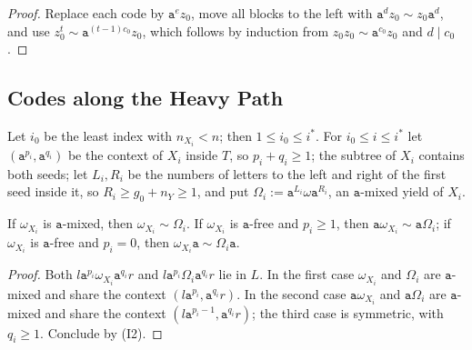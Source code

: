 \begin{proof}
Replace each code by $\mathtt a^ez_0$, move all blocks to the left with
$\mathtt a^dz_0\sim z_0\mathtt a^d$, and use $z_0^t\sim\mathtt a^{(t-1)c_0}z_0$,
which follows by induction from $z_0z_0\sim\mathtt a^{c_0}z_0$ and $d\mid c_0$.
\end{proof}

\subsection{Codes along the Heavy Path}

Let $i_0$ be the least index with $n_{X_i}<n$; then $1\le i_0\le i^*$.  For
$i_0\le i\le i^*$ let $(\mathtt a^{p_i},\mathtt a^{q_i})$ be the context of
$X_i$ inside $T$, so $p_i+q_i\ge1$; the subtree of $X_i$ contains both seeds;
let $L_i,R_i$ be the numbers of letters to the left and right of the first seed
inside it, so $R_i\ge g_0+n_Y\ge1$, and put $\Omega_i:=\mathtt a^{L_i}\omega\mathtt
a^{R_i}$, an $\mathtt a$-mixed yield of $X_i$.

\begin{lemma}
\label{lem:app-h-borrow}
If $\omega_{X_i}$ is $\mathtt a$-mixed, then $\omega_{X_i}\sim\Omega_i$.  If
$\omega_{X_i}$ is $\mathtt a$-free and $p_i\ge1$, then $\mathtt a\omega_{X_i}\sim\mathtt
a\Omega_i$; if $\omega_{X_i}$ is $\mathtt a$-free and $p_i=0$, then
$\omega_{X_i}\mathtt a\sim\Omega_i\mathtt a$.
\end{lemma}

\begin{proof}
Both $l\mathtt a^{p_i}\omega_{X_i}\mathtt a^{q_i}r$ and $l\mathtt a^{p_i}\Omega_i
\mathtt a^{q_i}r$ lie in $L$.  In the first case $\omega_{X_i}$ and $\Omega_i$ are
$\mathtt a$-mixed and share the context $(l\mathtt a^{p_i},\mathtt a^{q_i}r)$.  In the
second case $\mathtt a\omega_{X_i}$ and $\mathtt a\Omega_i$ are $\mathtt a$-mixed and
share the context $(l\mathtt a^{p_i-1},\mathtt a^{q_i}r)$; the third case is
symmetric, with $q_i\ge1$.  Conclude by (I2).
\end{proof}

